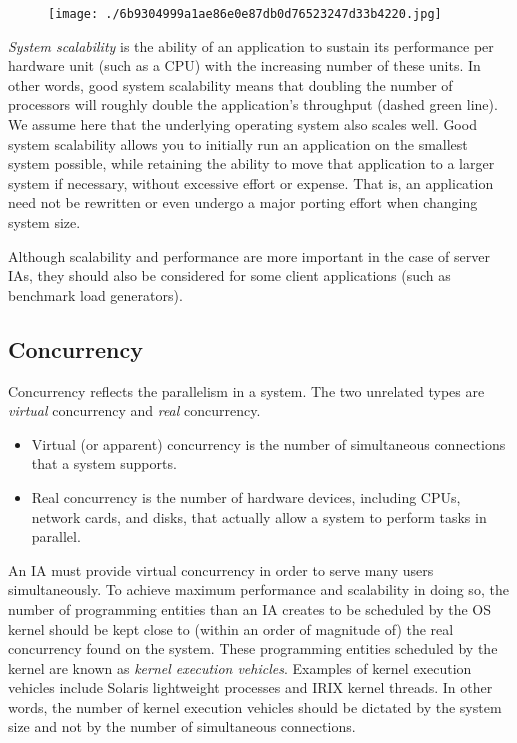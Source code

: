 \documentclass[a4paper,12pt,notitlepage,twoside,openright]{article}
\begin{document}
\begin{figure}
\texttt{[image: ./6b9304999a1ae86e0e87db0d76523247d33b4220.jpg]}
\end{figure}

\emph{System scalability} is the ability of an application to sustain
its performance per hardware unit (such as a CPU) with the increasing
number of these units. In other words, good system scalability means
that doubling the number of processors will roughly double the
application's throughput (dashed green line). We assume here that the
underlying operating system also scales well. Good system scalability
allows you to initially run an application on the smallest system
possible, while retaining the ability to move that application to a
larger system if necessary, without excessive effort or expense. That
is, an application need not be rewritten or even undergo a major porting
effort when changing system size.

Although scalability and performance are more important in the case of
server IAs, they should also be considered for some client applications
(such as benchmark load generators).

\protect\hypertarget{CONC}{}{}

\hypertarget{concurrency}{%
\subsection{Concurrency}\label{concurrency}}

Concurrency reflects the parallelism in a system. The two unrelated
types are \emph{virtual} concurrency and \emph{real} concurrency.

\begin{itemize}

\item
  Virtual (or apparent) concurrency is the number of simultaneous
  connections that a system supports.
\item
  Real concurrency is the number of hardware devices, including CPUs,
  network cards, and disks, that actually allow a system to perform
  tasks in parallel.
\end{itemize}

An IA must provide virtual concurrency in order to serve many users
simultaneously. To achieve maximum performance and scalability in doing
so, the number of programming entities than an IA creates to be
scheduled by the OS kernel should be kept close to (within an order of
magnitude of) the real concurrency found on the system. These
programming entities scheduled by the kernel are known as \emph{kernel
execution vehicles}. Examples of kernel execution vehicles include
Solaris lightweight processes and IRIX kernel threads. In other words,
the number of kernel execution vehicles should be dictated by the system
size and not by the number of simultaneous connections.
\end{document}
